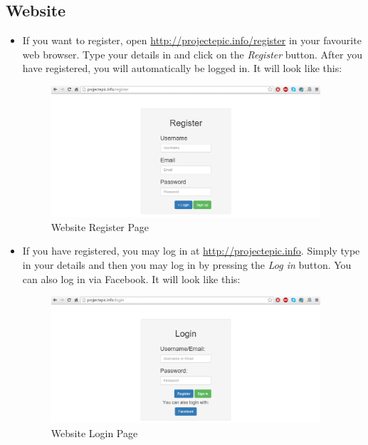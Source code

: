 \documentclass[a4paper,12pt,titlepage]{article}
\begin{document}
\subsection{Website}
    \begin{itemize}
        \item If you want to register, open \url{http://projectepic.info/register} in your favourite web browser. Type your details in and click on the \textit{Register} button. After you have registered, you will automatically be logged in. It will look like this: 
        \begin{figure}[H]
                \centering
                \includegraphics[width=10cm]{webPics/register}
                \caption{Website Register Page}
                \label{fig}
            \end{figure}       
        \item {If you have registered, you may log in at \url{http://projectepic.info}. Simply type in your details and then you may log in by pressing the \textit{Log in} button. You can also log in via Facebook. It will look like this: 
        \begin{figure}[H]
                \centering
                \includegraphics[width=10cm]{webPics/login}
                \caption{Website Login Page}
                \label{fig}
            \end{figure}}
        

\end{itemize}
\end{document}
